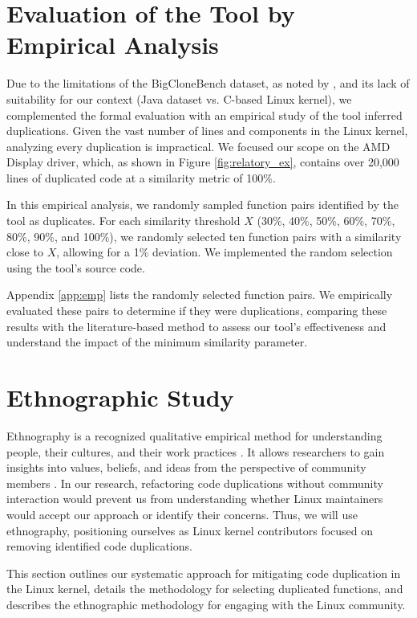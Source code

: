 \section{Evaluation of the Tool by Empirical Analysis}

\label{sec:metemp}

Due to the limitations of the BigCloneBench dataset, as noted by \cite{bigfail}, and its lack of suitability for our context (Java dataset vs. C-based Linux kernel), we complemented the formal evaluation with an empirical study of the tool inferred duplications.
%
Given the vast number of lines and components in the Linux kernel, analyzing every duplication is impractical. We focused our scope on the AMD Display driver, which, as shown in Figure \ref{fig:relatory_ex}, contains over 20,000 lines of duplicated code at a similarity metric of 100\%.

In this empirical analysis, we randomly sampled function pairs identified by the tool as duplicates. For each similarity threshold \(X\) (30\%, 40\%, 50\%, 60\%, 70\%, 80\%, 90\%, and 100\%), we randomly selected ten function pairs with a similarity close to \(X\), allowing for a 1\% deviation. We implemented the random selection using the tool's source code.

Appendix \ref{app:emp} lists the randomly selected function pairs. We empirically evaluated these pairs to determine if they were duplications, comparing these results with the literature-based method to assess our tool's effectiveness and understand the impact of the minimum similarity parameter.

\section{Ethnographic Study}

\label{sec:meteth}

Ethnography is a recognized qualitative empirical method for understanding people, 
their cultures, and their work practices \citep{bookethno}. It allows researchers 
to gain insights into values, beliefs, and ideas from the perspective of community 
members \citep{ethnosoft}. In our research, refactoring code duplications without 
community interaction would prevent us from understanding whether Linux maintainers 
would accept our approach or identify their concerns. Thus, we will use ethnography, 
positioning ourselves as Linux kernel contributors focused on removing identified 
code duplications.

This section outlines our systematic approach for mitigating code duplication in the Linux kernel, details the methodology for selecting duplicated functions, and describes the ethnographic methodology for engaging with the Linux community.

